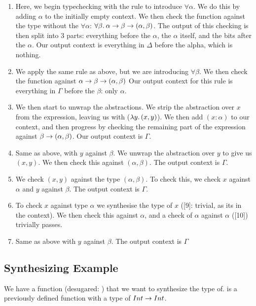 \begin{enumerate}
    \item Here, we begin typechecking with the \AllIntro rule to introduce $\forall \alpha$. We do this by adding $\alpha$ to the initially empty context. We then check the function against the type without the $\forall \alpha$: $\forall\beta.\:{\alpha \rightarrow \beta \rightarrow (\alpha, \beta)}$. The output of this checking is then split into 3 parts: everything before the $\alpha$, the $\alpha$ itself, and the bits after the $\alpha$. Our output context is everything in $\Delta$ before the alpha, which is nothing. 
    \item We apply the same rule as above, but we are introducing $\forall \beta$. We then check the function against ${\alpha \rightarrow \beta \rightarrow (\alpha, \beta)}$
    Our output context for this rule is everything in $\Gamma$ before the $\beta$: only $\alpha$.
    \item We then start to unwrap the abstractions. We strip the abstraction over $x$ from the expression, leaving us with ($\lambda y.\, (x, y)$). We then add $(x:\alpha)$ to our context, and then progress by checking the remaining part of the expression against ${\beta \rightarrow (\alpha, \beta)}$. Our output context is $\Gamma$. 
    \item Same as above, with $y$ against $\beta$. We unwrap the abstraction over $y$ to give us $(x, y)$. We then check this against ${(\alpha, \beta)}$. The output context is $\Gamma$.
    \item We check $(x, y)$ against the type $(\alpha, \beta)$. To check this, we check $x$ against $\alpha$ and $y$ against $\beta$. The output context is $\Gamma$.
    \item To check $x$ against type $\alpha$ we synthesise the type of $x$ ([9]: trivial, as its in the context). We then check this against $\alpha$, and a check of $\alpha$ against $\alpha$ ([10]) trivially passes.
    \item Same as above with $y$ against $\beta$. The output context is $\Gamma$
\end{enumerate}


\subsection{Synthesizing Example}
We have a function  (desugared: ) that we want to synthesize the type of.  is a previously defined function with a type of $Int \rightarrow Int$. 

